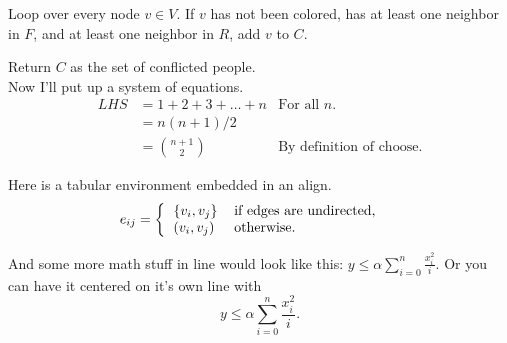 \documentclass[11pt]{article}
\begin{document}
Loop over every node $v \in V$.  If $v$ has not been colored, has at least one neighbor in $F$, and at least one neighbor in $R$, add $v$ to $C$.

Return $C$ as the set of conflicted people.\\


Now I'll put up a system of equations.
\begin{align}  	%
LHS &=  1+2+3+\ldots+n &\mbox{For all $n$.}\\
&=  n(n+1)/2 \\
&= {{n+1}\choose{2}} &\mbox{By definition of choose.}
\end{align}

Here is a tabular environment embedded in an align.
\begin{align*}
e_{ij} &=  \left\{ \begin{tabular}{ll} $\{v_i, v_j\}$ & if edges are undirected, \\
						       $(v_i, v_j)$ & otherwise. \end{tabular} \right.
\end{align*}

And some more math stuff in line would look like this: $y \leq \alpha \sum_{i = 0}^n \frac{x_i^2}{i}$.  Or you can have it centered on it's own line with $$y \leq \alpha \sum_{i = 0}^n \frac{x_i^2}{i}.$$
\end{document}
